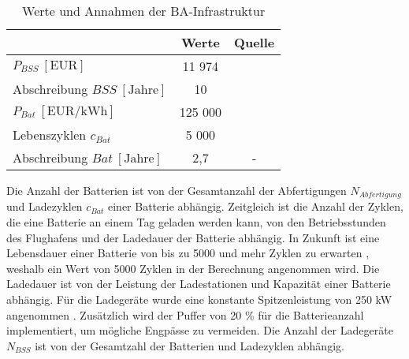 %
%
%
\begin{table}[h]
	\begin{center}
    \caption{Werte und Annahmen der BA-Infrastruktur}
	\label{BA_Infrastrukturtab}
	\begin{tabular}{|l|c|c|}
		\hline
		 & \textbf{Werte} & \textbf{Quelle} \\ \hline
		$P_{BSS} ~[\text{EUR}]$ &  11 974  & \cite{guo2020aviation} \\ \hline
      Abschreibung $BSS ~[\text{Jahre}]$&  10  & \cite{salucci2020optimal} \\ \hline
		$P_{Bat} ~[\text{EUR/kWh}]$ & 125 000 & \cite{guo2020aviation} \\ \hline
      Lebenszyklen $c_{Bat}$ & 5 000 & \cite{reimers2018introduction} \\ \hline
      Abschreibung $Bat ~[\text{Jahre}]$& 2,7 & -\\ \hline
	\end{tabular}
    \end{center}
\end{table}
Die Anzahl der Batterien ist von der Gesamtanzahl der Abfertigungen $N_{Abfertigung}$ 
und Ladezyklen $c_{Bat}$ einer Batterie abhängig. 
Zeitgleich ist die Anzahl der Zyklen, die eine Batterie an einem Tag geladen werden kann, 
von den Betriebsstunden des Flughafens und der Ladedauer der Batterie abhängig. 
In Zukunft ist eine Lebensdauer einer Batterie von bis zu 5000 und mehr Zyklen zu erwarten \cite{reimers2018introduction}, 
weshalb ein Wert von 5000 Zyklen in der Berechnung angenommen wird.
Die Ladedauer ist von der Leistung der Ladestationen und Kapazität einer Batterie abhängig.
Für die Ladegeräte wurde eine konstante Spitzenleistung von 250 kW angenommen \cite{salucci2020optimal}. 
Zusätzlich wird der Puffer von 20 \% für die Batterieanzahl implementiert, um mögliche Engpässe zu vermeiden. 
Die Anzahl der Ladegeräte $N_{BSS}$ ist von der Gesamtzahl der Batterien und Ladezyklen abhängig.

